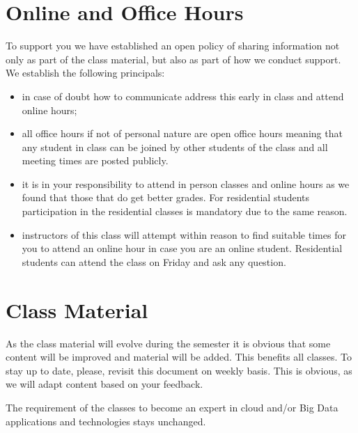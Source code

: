 \section{Online  and Office Hours}

To support you we have established an open policy of sharing
information not only as part of the class material, but also as part
of how we conduct support. We establish the following principals:

\begin{itemize}

\item in case of doubt how to communicate address this early in class
  and attend online hours;

\item all office hours if not of personal nature are open office hours
  meaning that any student in class can be joined by other students of the
  class and  all meeting times are posted publicly. 

\item it is in your responsibility to attend in person classes and
  online hours as we found that those that do get better grades. For
  residential students participation in the residential classes is
  mandatory due to the same reason.

\item instructors of this class will attempt within reason to find
  suitable times for you to attend an online hour in case you are an
  online student. Residential students can attend the class on Friday
  and ask any question. 

\end{itemize}

\section{Class Material}

\begin{WARNING}
  As the class material will evolve during the semester it is obvious
  that some content will be improved and material will be added. This
  benefits all classes. To stay up to date, please, revisit this
  document on weekly basis. This is obvious, as we will adapt content
  based on your feedback. 

  The requirement of the classes to become an expert in cloud and/or
  Big Data applications and technologies stays unchanged.
\end{WARNING}

